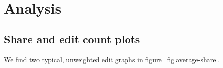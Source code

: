 \section{Analysis}
\subsection*{Share and edit count plots}
We find two typical, unweighted edit graphs in
figure~\ref{fig:average-share}.

